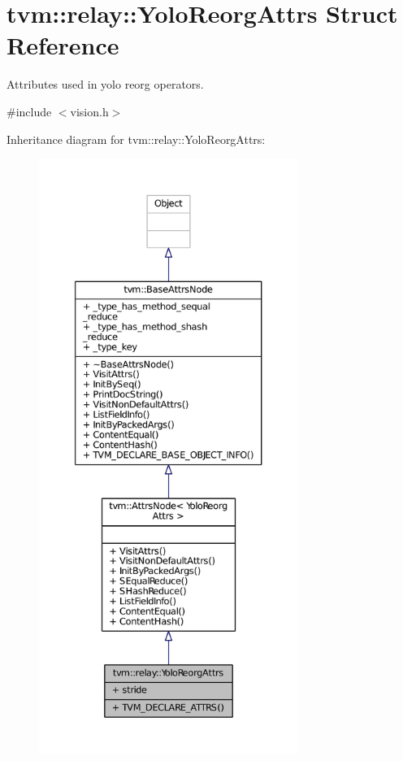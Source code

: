 \hypertarget{structtvm_1_1relay_1_1YoloReorgAttrs}{}\section{tvm\+:\+:relay\+:\+:Yolo\+Reorg\+Attrs Struct Reference}
\label{structtvm_1_1relay_1_1YoloReorgAttrs}


Attributes used in yolo reorg operators.  




{\ttfamily \#include $<$vision.\+h$>$}



Inheritance diagram for tvm\+:\+:relay\+:\+:Yolo\+Reorg\+Attrs\+:
\nopagebreak
\begin{figure}[H]
\begin{center}
\leavevmode
\includegraphics[height=550pt]{structtvm_1_1relay_1_1YoloReorgAttrs__inherit__graph}
\end{center}
\end{figure}


